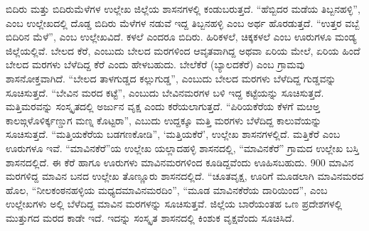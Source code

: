 ಬಿದಿರು ಮತ್ತು ಬಿದಿರುಮೆಳೆಗಳ ಉಲ್ಲೇಖ ಜಿಲ್ಲೆಯ ಶಾಸನಗಳಲ್ಲಿ ಕಂಡುಬರುತ್ತದೆ. “ಹೆಬ್ಬಿದರ ಮಡೆಯ ತಿಬ್ಬನಹಳ್ಳಿ”, ಎಂಬ ಉಲ್ಲೇಖದಲ್ಲಿ ದೊಡ್ಡ ಬಿದಿರು ಮೆಳೆಗಳ ನಡುವೆ ಇದ್ದ ತಿಬ್ಬನಹಳ್ಳಿ ಎಂಬ ಅರ್ಥ ಹೊರಡುತ್ತದೆ. “ಉತ್ತರ ವಬ್ಬೆ ಬಿದಿರಿನ ಮೆಳೆ”, ಎಂಬ ಉಲ್ಲೇಖವಿದೆ. ಕಳಲೆ ಎಂದರೂ ಬಿದಿರು. ಹಿರಿಕಳಲೆ, ಚಿಕ್ಕಕಳಲೆ ಎಂಬ ಊರುಗಳೂ ಮಂಡ್ಯ ಜಿಲ್ಲೆಯಲ್ಲಿವೆ. ಬೇಲದ ಕೆರೆ, ಎಂಬುದು ಬೇಲದ ಮರಗಳಿಂದ ಆವೃತವಾಗಿದ್ದ ಅಥವಾ ಏರಿಯ ಮೇಲೆ, ಏರಿಯ ಹಿಂದೆ ಬೇಲದ ಮರಗಳು ಬೆಳೆದಿದ್ದ ಕೆರೆ ಎಂದು ಹೇಳಬಹುದು. ಬೇಲೆಕೆರೆ (ಬ್ಯಾಲದಕೆರೆ) ಎಂಬ ಗ್ರಾಮವು ಶಾಸನೋಕ್ತವಾಗಿದೆ. “ಬೇಲದ ತಾಳಗುಡ್ಡದ ಕಲ್ಲುಗುಡ್ಡ”, ಎಂಬುದು ಬೇಲದ ಮರಗಳು ಬೆಳೆದಿದ್ದ ಗುಡ್ಡವನ್ನು ಸೂಚಿಸುತ್ತದೆ. “ಬೇವಿನ ಮರದ ಕಟ್ಟೆ”, ಎಂಬುದು ಬೇವಿನಮರಗಳ ಬಳಿ ಇದ್ದ ಕಟ್ಟೆಯನ್ನು ಸೂಚಿಸುತ್ತದೆ. ಮತ್ತಿಮರವನ್ನು ಸಂಸ್ಕೃತದಲ್ಲಿ ಅರ್ಜುನ ವೃಕ್ಷ ಎಂದು ಕರೆಯಲಾಗುತ್ತದೆ. “ಪಿರಿಯಕೆರೆಯ ಕೆಳಗೆ ಮೞಅ್ತ ಕಾಲಙ್ಗಳೊಳಿರ್ಕ್ಕಣ್ಡುಗ ಮಣ್ನ ಕೊಟ್ಟರಾ”, ಎಬುದು ಉದ್ದಕ್ಕೂ ಮತ್ತಿ ಮರಗಳು ಬೆಳೆದಿದ್ದ ಕಾಲುವೆಯನ್ನು ಸೂಚಿಸುತ್ತದೆ. “ಮತ್ತಿಯಕೆರೆಯ ಬಡಗಣಕೋಡಿ”, ‘ಮತ್ತಿಯಕೆರೆ’, ಉಲ್ಲೇಖ ಶಾಸನಗಳಲ್ಲಿದೆ. ಮತ್ತಿಕೆರೆ ಎಂಬ ಊರುಗಳೂ ಇವೆ. “ಮಾವಿನಕೆರೆ”ಯ ಉಲ್ಲೇಖ ಯಲ್ಲಾದಹಳ್ಳಿ ಶಾಸನದಲ್ಲಿ, “ಮಾವಿನಕೆರೆ” ಗ್ರಾಮದ ಉಲ್ಲೇಖ ಬಸ್ತಿ ಶಾಸನದಲ್ಲಿದೆ. ಈ ಕೆರೆ ಹಾಗೂ ಊರುಗಳು ಮಾವಿನಮರಗಳಿಂದ ಕೂಡಿದ್ದವೆಂದು ಊಹಿಸಬಹುದು. 900 ಮಾವಿನ ಮರಗಳಿದ್ದ ಮಾವಿನ ಬನದ ಉಲ್ಲೇಖ ತೊಣ್ಣೂರು ಶಾಸನದಲ್ಲಿದೆ. “ಚೂತವೃಕ್ಷ, ಊರಿಗೆ ಮೂಡಲಾಗಿ ಮಾವಿನಮರದ ಹೊಲ, “ನೀಲಕಂಠನಹಳ್ಳಿಯ ಮಧ್ಯದ\break ಮಾವಿನಮರದಿಂ”, “ಮೂಡ ಮಾವಿನಕೆರೆಯ ದಾರಿಯಿಂದ”, ಎಂಬ ಉಲ್ಲೇಖಗಳು ಅಲ್ಲಿ ಬೆಳೆದಿದ್ದ ಮಾವಿನ ಮರಗಳನ್ನು ಸೂಚಿಸುತ್ತವೆ. ಜಿಲ್ಲೆಯ ಬಾರೆಯಂತಹ ಒಣ ಪ್ರದೇಶಗಳಲ್ಲಿ ಮುತ್ತುಗದ ಮರದ ಕಾಡೇ ಇದೆ. ಇದನ್ನು ಸಂಸ್ಕೃತ ಶಾಸನದಲ್ಲಿ ಕಿಂಶುಕ ವೃಕ್ಷವೆಂದು ಸೂಚಿಸಿದೆ.

